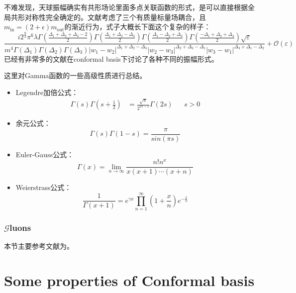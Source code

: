 不难发现，天球振幅确实有共形场论里面多点关联函数的形式，是可以直接根据全局共形对称性完全确定的。文献\cite{Pasterski:2016qvg}考虑了三个有质量标量场耦合，且$m_{\text{in}}=(2+\epsilon)m_{\text{out}}$的渐近行为，式子大概长下面这个复杂的样子：
\begin{equation}
	\frac{i2^{\frac{9}{2}}\pi^6\lambda\Gamma(\frac{\Delta_1+\Delta_2+\Delta_3-2}{2})\Gamma(\frac{\Delta_1+\Delta_2-\Delta_3}{2})\Gamma(\frac{\Delta_1-\Delta_2+\Delta_3}{2})\Gamma(\frac{-\Delta_1+\Delta_2+\Delta_3}{2})\sqrt{\varepsilon}}{m^4\Gamma(\Delta_1)\Gamma(\Delta_2)\Gamma(\Delta_3)|w_1-w_2|^{\Delta_1+\Delta_2-\Delta_3}|w_2-w_3|^{\Delta_2+\Delta_3-\Delta_1}|w_3-w_1|^{\Delta_3+\Delta_1-\Delta_2}}+\mathcal{O}(\varepsilon)
\end{equation}
已经有非常多的文献在conformal basis下讨论了各种不同的振幅形式。
\begin{remark}
	这里对Gamma函数的一些高级性质进行总结。
	\begin{itemize}
		\item Legendre加倍公式：
		\begin{equation}
			\begin{aligned}\Gamma(s)\Gamma(s+\frac{1}{2})&=\frac{\sqrt{\pi}}{2^{2s-1}}\Gamma(2s)&&s>0\end{aligned}
		\end{equation}
		\item 余元公式：
		\begin{equation}
			\Gamma(s)\Gamma(1-s)=\frac{\pi}{sin(\pi s)}
		\end{equation}
		\item Euler-Gauss公式：
		\begin{equation}
			\Gamma(x)=\lim_{n\to\infty}\frac{n!n^x}{x(x+1)\cdots(x+n)}
		\end{equation}
		\item Weierstrass公式：
		\begin{equation}
			\frac1{\Gamma(x+1)}=e^{\gamma x}\prod_{n=1}^{\infty}\left(1+\frac xn\right)e^{-\frac xn}
		\end{equation}
	\end{itemize}
\end{remark}
\subsubsection{$\mathcal{G}$luons}
本节主要参考文献为\cite{Pasterski:2017ylz}。
\section{Some properties of Conformal basis}
